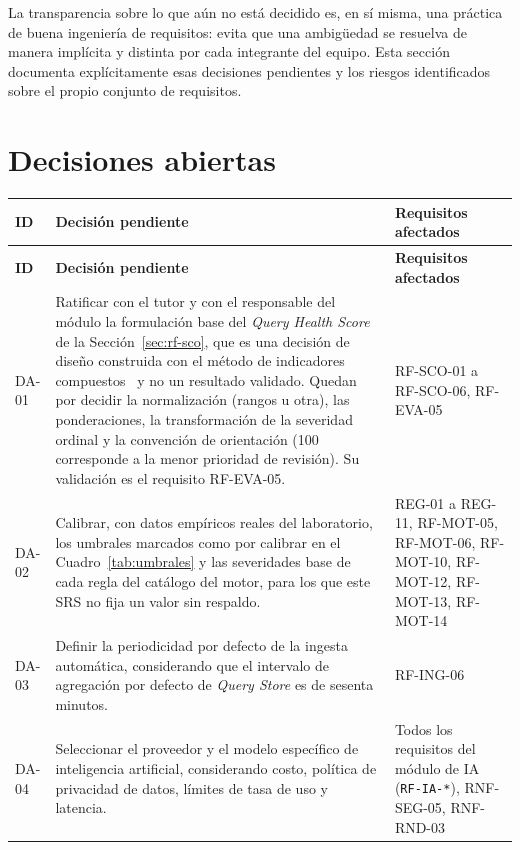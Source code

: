 \documentclass[11pt,a4paper]{report}
\begin{document}
La transparencia sobre lo que a\'un no est\'a decidido es, en s\'i misma, una pr\'actica de buena ingenier\'ia de requisitos: evita que una ambig\"uedad se resuelva de manera impl\'icita y distinta por cada integrante del equipo. Esta secci\'on documenta expl\'icitamente esas decisiones pendientes y los riesgos identificados sobre el propio conjunto de requisitos.

\section{Decisiones abiertas}
\label{sec:decisiones}

\begin{xltabular}{\linewidth}{@{}p{1.3cm}Xp{2.6cm}@{}}
\toprule
\textbf{ID} & \textbf{Decisi\'on pendiente} & \textbf{Requisitos afectados} \\
\midrule
\endfirsthead
\toprule
\textbf{ID} & \textbf{Decisi\'on pendiente} & \textbf{Requisitos afectados} \\
\midrule
\endhead
\bottomrule
\endlastfoot
DA-01 & Ratificar con el tutor y con el responsable del m\'odulo la formulaci\'on base del \textit{Query Health Score} de la Secci\'on~\ref{sec:rf-sco}, que es una decisi\'on de dise\~no construida con el m\'etodo de indicadores compuestos~\cite{R32} y no un resultado validado. Quedan por decidir la normalizaci\'on (rangos u otra), las ponderaciones, la transformaci\'on de la severidad ordinal y la convenci\'on de orientaci\'on (100 corresponde a la menor prioridad de revisi\'on). Su validaci\'on es el requisito RF-EVA-05. & RF-SCO-01 a RF-SCO-06, RF-EVA-05 \\
DA-02 & Calibrar, con datos emp\'iricos reales del laboratorio, los umbrales marcados como por calibrar en el Cuadro~\ref{tab:umbrales} y las severidades base de cada regla del cat\'alogo del motor, para los que este SRS no fija un valor sin respaldo. & REG-01 a REG-11, RF-MOT-05, RF-MOT-06, RF-MOT-10, RF-MOT-12, RF-MOT-13, RF-MOT-14 \\
DA-03 & Definir la periodicidad por defecto de la ingesta autom\'atica, considerando que el intervalo de agregaci\'on por defecto de \textit{Query Store} es de sesenta minutos. & RF-ING-06 \\
DA-04 & Seleccionar el proveedor y el modelo espec\'ifico de inteligencia artificial, considerando costo, pol\'itica de privacidad de datos, l\'imites de tasa de uso y latencia. & Todos los requisitos del m\'odulo de IA (\texttt{RF-IA-*}), RNF-SEG-05, RNF-RND-03 \\

\end{xltabular}
\end{document}
